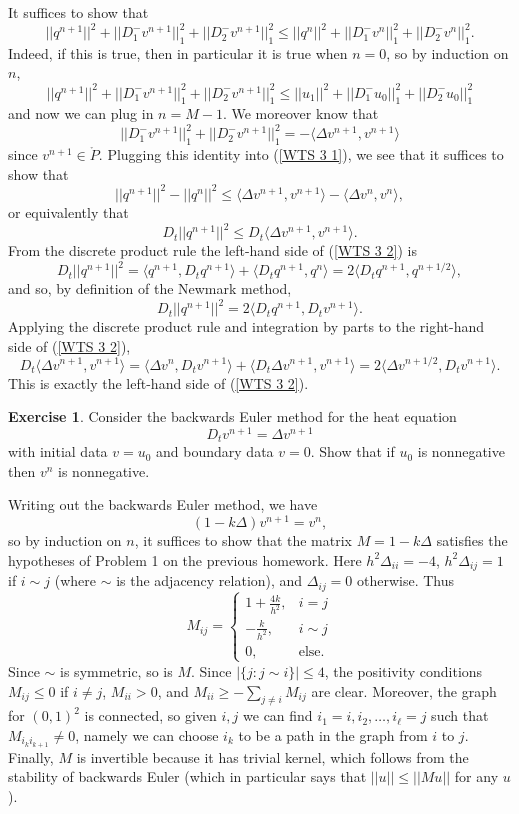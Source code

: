 \documentclass[10pt]{article}
\theoremstyle{definition}
\newtheorem{exer}{Exercise}
\begin{document}
It suffices to show that
\begin{equation}\label{WTS 3 1}||q^{n+1}||^2 + ||D_1^- v^{n+1}||_1^2 + ||D_2^- v^{n+1}||_1^2 \leq ||q^n||^2 + ||D_1^- v^n||_1^2 + ||D_2^- v^n||_1^2.
\end{equation}
Indeed, if this is true, then in particular it is true when $n = 0$, so by induction on $n$,
$$||q^{n+1}||^2 + ||D_1^- v^{n+1}||_1^2 + ||D_2^- v^{n+1}||_1^2 \leq ||u_1||^2 + ||D_1^- u_0||_1^2 + ||D_2^- u_0||_1^2$$
and now we can plug in $n = M - 1$.
We moreover know that
$$||D_1^- v^{n+1}||_1^2 + ||D_2^- v^{n+1}||_1^2 = -\langle \Delta v^{n+1}, v^{n+1}\rangle$$
since $v^{n+1} \in \mathring P$.
Plugging this identity into (\ref{WTS 3 1}), we see that it suffices to show that
$$
||q^{n + 1}||^2 - ||q^n||^2 \leq \langle \Delta v^{n+1}, v^{n+1}\rangle - \langle \Delta v^n, v^n\rangle,$$
or equivalently that
\begin{equation}\label{WTS 3 2}
D_t ||q^{n+1}||^2 \leq D_t \langle \Delta v^{n+1}, v^{n+1}\rangle.
\end{equation}
From the discrete product rule the left-hand side of (\ref{WTS 3 2}) is
$$D_t ||q^{n+1}||^2 = \langle q^{n+1}, D_t q^{n+1}\rangle + \langle D_t q^{n+1}, q^n\rangle = 2\langle D_t q^{n+1}, q^{n + 1/2}\rangle,$$
and so, by definition of the Newmark method,
$$D_t ||q^{n+1}||^2 = 2\langle D_t q^{n + 1}, D_t v^{n + 1}\rangle.$$
Applying the discrete product rule and integration by parts to the right-hand side of (\ref{WTS 3 2}),
$$D_t \langle \Delta v^{n+1}, v^{n+1}\rangle = \langle \Delta v^n, D_t v^{n+1}\rangle + \langle D_t \Delta v^{n+1}, v^{n+1}\rangle = 2\langle \Delta v^{n+1/2}, D_t v^{n + 1}\rangle.$$
This is exactly the left-hand side of (\ref{WTS 3 2}).

\begin{exer}
Consider the backwards Euler method for the heat equation
$$D_t v^{n+1} = \Delta v^{n+1}$$
with initial data $v = u_0$ and boundary data $v = 0$.
Show that if $u_0$ is nonnegative then $v^n$ is nonnegative.
\end{exer}

Writing out the backwards Euler method, we have
$$(1 - k\Delta) v^{n + 1} = v^n,$$
so by induction on $n$, it suffices to show that the matrix $M = 1 - k\Delta$ satisfies the hypotheses of Problem 1 on the previous homework.
Here $h^2\Delta_{ii} = -4$, $h^2 \Delta_{ij} = 1$ if $i \sim j$ (where $\sim$ is the adjacency relation), and $\Delta_{ij} = 0$ otherwise.
Thus
$$M_{ij} = \begin{cases}
1 + \frac{4k}{h^2}, & i = j\\
- \frac{k}{h^2}, &i \sim j \\
0, & \text{else.}
\end{cases}$$
Since $\sim$ is symmetric, so is $M$. Since $|\{j: j \sim i\}| \leq 4$, the positivity conditions $M_{ij} \leq 0$ if $i \neq j$, $M_{ii} > 0$, and $M_{ii} \geq - \sum_{j \neq i} M_{ij}$ are clear.
Moreover, the graph for $(0, 1)^2$ is connected, so given $i,j$ we can find $i_1 = i, i_2, \dots, i_\ell = j$ such that $M_{i_ki_{k+1}} \neq 0$, namely we can choose $i_k$ to be a path in the graph from $i$ to $j$.
Finally, $M$ is invertible because it has trivial kernel, which follows from the stability of backwards Euler (which in particular says that $||u|| \leq ||Mu||$ for any $u$).
\end{document}
